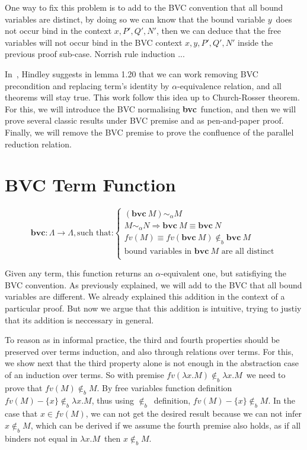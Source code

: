 \documentclass{article}
\newcommand{\alp}{\ensuremath{\alpha}}
\newcommand{\alpsym}{\ensuremath{\sim_\alpha}}
\newcommand{\ninb}{\ensuremath{\not\in_b}}
\newcommand{\bvc}{\textbf{bvc}}
\newcommand{\f}{\ensuremath{\rightarrow}}
\newcommand{\lam}{\ensuremath{\lambda}}
\begin{document}
One way to fix this problem is to add to the BVC convention that all bound variables are distinct, by doing so we can know that the bound variable $y$\ does not occur bind in the context $x,P',Q',N'$, then we can deduce that the free variables will not occur bind in the BVC context $x,y,P',Q',N'$ inside the previous proof sub-case.
Norrish rule induction ...

In~\cite{Hindley:2008}, Hindley suggests in lemma 1.20 that we can work removing BVC precondition and replacing term's identity by \alp-equivalence relation, and all theorems will stay true. This work follow this idea up to Church-Rosser theorem. For this, we will introduce the BVC normalising \bvc\ function, and then we will prove several classic results under BVC premise and as pen-and-paper proof. Finally, we will remove the BVC premise to prove the confluence of the parallel reduction relation.

\section{BVC Term Function}

\[
  \bvc : \Lambda \f \Lambda, \text{such that:} \left\{
    \begin{array}{l}
      (\bvc\ M) \alpsym M \\
      M \alpsym N \Rightarrow \bvc\ M \equiv \bvc\ N  \\
      fv (M) \equiv fv(\bvc\ M)  \ninb \bvc\ M \\
      \text{bound variables in } \bvc\  M \text{ are all distinct} \\
  \end{array} \right.
\]

Given any term, this function returns an \alp-equivalent one, but satisfiying the BVC convention. As previously explained, we will add to the BVC that all bound variables are different. We already explained this addition in the context of a particular proof. But now we argue that this addition is intuitive, trying to justiy that its addition is neccessary in general.

To reason as in informal practice, the third and fourth properties should be preserved over terms induction, and also through relations over terms. For this, we show next that the third property alone is not enough in the abstraction case of an induction over terms. So with premise $fv (\lam x. M) \ninb \lam x .M$\ we need to prove that $fv(M) \ninb M$. By free variables function definition $fv (M) - \{ x \}  \ninb \lam x .M$, thus using $\ninb$\ definition, $fv (M) - \{ x \}  \ninb M$. In the case that $x \in fv(M)$, we can not get the desired result because we can not infer $x \ninb M$, which can be derived if we assume the fourth premise also holds, as if all binders not equal in $\lam x . M$\ then $x \ninb M$.
\end{document}
